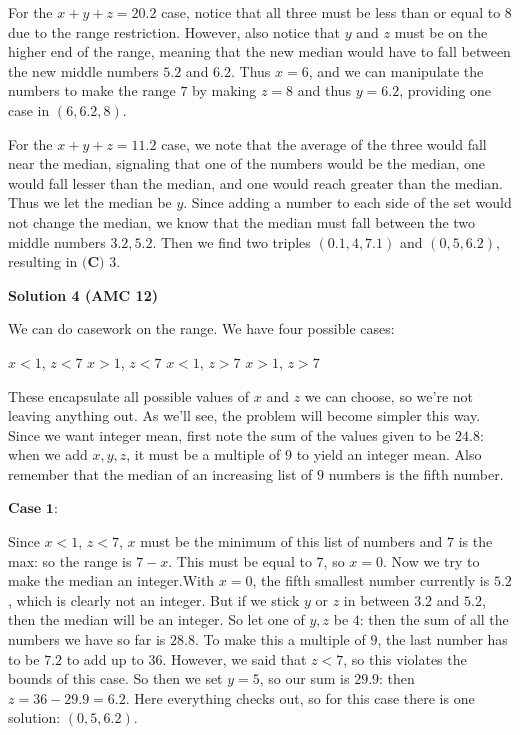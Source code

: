 \begin{enumerate}
 For the $x+y+z=20.2$ case, notice that all three must be less than or equal to $8$ due to the range restriction. However, also notice that $y$ and $z$ must be on the higher end of the range, meaning that the new median would have to fall between the new middle numbers $5.2$ and $6.2$. Thus $x=6$, and we can manipulate the numbers to make the range $7$ by making $z=8$ and thus $y=6.2$, providing one case in $(6,6.2,8)$.

 For the $x+y+z=11.2$ case, we note that the average of the three would fall near the median, signaling that one of the numbers would be the median, one would fall lesser than the median, and one would reach greater than the median. Thus we let the median be $y$. Since adding a number to each side of the set would not change the median, we know that the median must fall between the two middle numbers $3.2,5.2$. Then we find two triples $(0.1,4,7.1)$ and $(0,5,6.2)$, resulting in $\boxed{\textbf{(C) }3}$.

 



\textbf{Solution 4 (AMC 12)}

We can do casework on the range. We have four possible cases:

 $x<1$, $z<7$
$x>1$, $z<7$
$x<1$, $z>7$
$x>1$, $z>7$

 These encapsulate all possible values of $x$ and $z$ we can choose, so we're not leaving anything out. As we'll see, the problem will become simpler this way. Since we want integer mean, first note the sum of the values given to be $24.8$: when we add $x,y,z$, it must be a multiple of $9$ to yield an integer mean. Also remember that the median of an increasing list of $9$ numbers is the fifth number.

 $\textbf{Case 1:}$

 Since $x<1$, $z<7$, $x$ must be the minimum of this list of numbers and $7$ is the max: so the range is $7-x$. This must be equal to $7$, so $x=0$. Now we try to make the median an integer.With $x=0$, the fifth smallest number currently is $5.2$, which is clearly not an integer. But if we stick $y$ or $z$ in between $3.2$ and $5.2$, then the median will be an integer. So let one of $y,z$ be $4$: then the sum of all the numbers we have so far is $28.8$. To make this a multiple of $9$, the last number has to be $7.2$ to add up to $36$. However, we said that $z<7$, so this violates the bounds of this case. So then we set $y=5$, so our sum is $29.9$: then $z=36-29.9 = 6.2$. Here everything checks out, so for this case there is one solution: $(0,5,6.2)$.


\end{enumerate}
